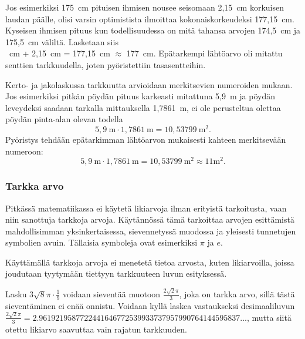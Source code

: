 Jos esimerkiksi 175~cm pituisen ihmisen
nousee seisomaan 2,15~cm korkuisen laudan päälle, olisi varsin
optimistista ilmoittaa kokonaiskorkeudeksi 177,15~cm. Kyseisen ihmisen pituus kun todellisuudessa on mitä tahansa arvojen
174,5~cm ja 175,5~cm väliltä. Lasketaan siis\\
~cm + 2,15~cm = 177,15~cm $\approx$ 177~cm. 
Epätarkempi lähtöarvo oli mitattu senttien tarkkuudella, joten pyöristettiin tasasentteihin.

Kerto- ja jakolaskussa tarkkuutta arvioidaan merkitsevien numeroiden mukaan. Jos esimerkiksi pitkän pöydän pituus karkeasti
mitattuna 5,9~m ja pöydän leveydeksi saadaan tarkalla mittauksella
1,7861~m, ei ole perusteltua olettaa pöydän pinta-alan olevan todella
\[ 5,9~\textrm{m} \cdot 1,7861~\textrm{m} = 10,53799~\textrm{m}^2. \] 
Pyöristys tehdään epätarkimman
lähtöarvon mukaisesti kahteen merkitsevään numeroon:
\[ 5,9~\textrm{m} \cdot 1,7861~\textrm{m} = 10,53799~\textrm{m}^2 \approx 11 \textrm{m}^2.\] 

\subsubsection*{Tarkka arvo}

Pitkässä matematiikassa ei käytetä likiarvoja ilman erityistä tarkoitusta, vaan niin sanottuja tarkkoja arvoja. Käytännössä tämä tarkoittaa arvojen esittämistä mahdollisimman yksinkertaisessa, sievennetyssä muodossa ja yleisesti tunnetujen symbolien avuin. Tällaisia symboleja ovat esimerkiksi $\pi$ ja $e$.

Käyttämällä tarkkoja arvoja ei menetetä tietoa arvosta, kuten likiarvoilla, joissa joudutaan tyytymään tiettyyn tarkkuuteen luvun esityksessä.


\begin{esimerkki}
Lasku $3\sqrt{8}\pi \cdot \frac{1}{9}$ voidaan sieventää muotoon $\frac{2\sqrt{2}\pi}{3}$, joka on tarkka arvo, sillä tästä sieventäminen ei enää onnistu. Voidaan kyllä laskea vastaukseksi desimaaliluvun $\frac{2\sqrt{2}\pi}{3}=2.9619219587722441646772539933737957990764144595837...$, mutta siitä otettu likiarvo saavuttaa vain rajatun tarkkuuden. 
\end{esimerkki}


